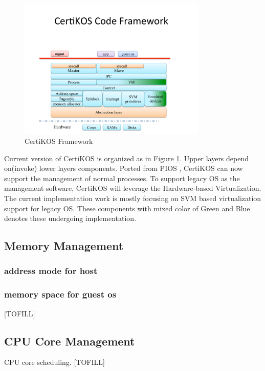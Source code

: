 \documentclass[a4paper,12pt]{article}
\begin{document}
\begin{figure}[!ht]
 \centerline{
 \includegraphics[width=0.8\textwidth]{certikos_framework}}
 \caption{CertiKOS Framework} \label{fig:framework}
\end{figure}

Current version of CertiKOS  is organized as in Figure \ref{fig:framework}. Upper layers depend on(invoke) lower layers components.  Ported from PIOS \cite{PIOS}, CertiKOS can now support the management of normal processes. To support legacy OS as the management software, CertiKOS will leverage the Hardware-based Virtualization. The current implementation work is mostly focusing on SVM based virtualization support for legacy OS.  These components with mixed color of Green and Blue denotes these undergoing implementation. 

\subsection{Memory Management}

\subsubsection{address mode for host}

\subsubsection{memory space for guest os }

[TOFILL]
\subsection{CPU Core Management}

CPU core scheduling.
[TOFILL]
\end{document}
